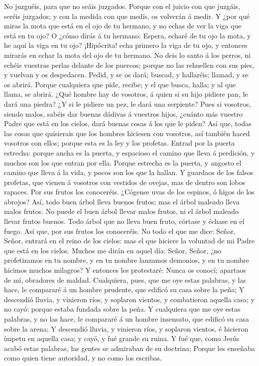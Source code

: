  No juzguéis, para que no seáis juzgados. 
Porque con el juicio con que juzgáis, seréis juzgados; y con la medida
con que medís, os volverán á medir.  Y ¿por qué miras la
mota que está en el ojo de tu hermano, y no echas de ver la viga que
está en tu ojo?  O ¿cómo dirás á tu hermano: Espera, echaré
de tu ojo la mota, y he aquí la viga en tu ojo?  ¡Hipócrita!
echa primero la viga de tu ojo, y entonces mirarás en echar la mota del
ojo de tu hermano.  No deis lo santo á los perros, ni echéis
vuestras perlas delante de los puercos; porque no las rehuellen con sus
pies, y vuelvan y os despedacen.  Pedid, y se os dará;
buscad, y hallaréis; llamad, y se os abrirá.  Porque
cualquiera que pide, recibe; y el que busca, halla; y al que llama, se
abrirá.  ¿Qué hombre hay de vosotros, á quien si su hijo
pidiere pan, le dará una piedra?  ¿Y si le pidiere un pez,
le dará una serpiente?  Pues si vosotros, siendo malos,
sabéis dar buenas dádivas á vuestros hijos, ¿cuánto más vuestro Padre
que está en los cielos, dará buenas cosas á los que le piden?
 Así que, todas las cosas que quisierais que los hombres
hiciesen con vosotros, así también haced vosotros con ellos; porque esta
es la ley y los profetas.  Entrad por la puerta estrecha:
porque ancha es la puerta, y espacioso el camino que lleva á perdición,
y muchos son los que entran por ella.  Porque estrecha es
la puerta, y angosto el camino que lleva á la vida, y pocos son los que
la hallan.  Y guardaos de los falsos profetas, que vienen á
vosotros con vestidos de ovejas, mas de dentro son lobos rapaces.
 Por sus frutos los conoceréis. ¿Cógense uvas de los
espinos, ó higos de los abrojos?  Así, todo buen árbol
lleva buenos frutos; mas el árbol maleado lleva malos frutos.
 No puede el buen árbol llevar malos frutos, ni el árbol
maleado llevar frutos buenos.  Todo árbol que no lleva buen
fruto, córtase y échase en el fuego.  Así que, por sus
frutos los conoceréis.  No todo el que me dice: Señor,
Señor, entrará en el reino de los cielos: mas el que hiciere la voluntad
de mi Padre que está en los cielos.  Muchos me dirán en
aquel día: Señor, Señor, ¿no profetizamos en tu nombre, y en tu nombre
lanzamos demonios, y en tu nombre hicimos muchos milagros? 
Y entonces les protestaré: Nunca os conocí; apartaos de mí, obradores de
maldad.  Cualquiera, pues, que me oye estas palabras, y las
hace, le compararé á un hombre prudente, que edificó su casa sobre la
peña;  Y descendió lluvia, y vinieron ríos, y soplaron
vientos, y combatieron aquella casa; y no cayó: porque estaba fundada
sobre la peña.  Y cualquiera que me oye estas palabras, y
no las hace, le compararé á un hombre insensato, que edificó su casa
sobre la arena;  Y descendió lluvia, y vinieron ríos, y
soplaron vientos, é hicieron ímpetu en aquella casa; y cayó, y fué
grande su ruina.  Y fué que, como Jesús acabó estas
palabras, las gentes se admiraban de su doctrina;  Porque
les enseñaba como quien tiene autoridad, y no como los escribas.

